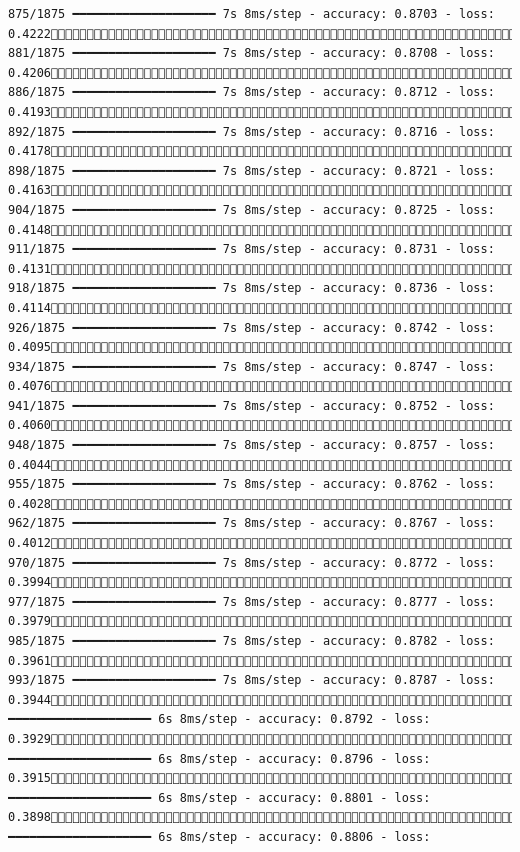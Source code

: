 \documentclass[
  letterpaper,
  DIV=11,
  numbers=noendperiod]{scrreprt}
\begin{document}
\begin{verbatim}
875/1875 ━━━━━━━━━━━━━━━━━━━━ 7s 8ms/step - accuracy: 0.8703 - loss: 0.4222 881/1875 ━━━━━━━━━━━━━━━━━━━━ 7s 8ms/step - accuracy: 0.8708 - loss: 0.4206 886/1875 ━━━━━━━━━━━━━━━━━━━━ 7s 8ms/step - accuracy: 0.8712 - loss: 0.4193 892/1875 ━━━━━━━━━━━━━━━━━━━━ 7s 8ms/step - accuracy: 0.8716 - loss: 0.4178 898/1875 ━━━━━━━━━━━━━━━━━━━━ 7s 8ms/step - accuracy: 0.8721 - loss: 0.4163 904/1875 ━━━━━━━━━━━━━━━━━━━━ 7s 8ms/step - accuracy: 0.8725 - loss: 0.4148 911/1875 ━━━━━━━━━━━━━━━━━━━━ 7s 8ms/step - accuracy: 0.8731 - loss: 0.4131 918/1875 ━━━━━━━━━━━━━━━━━━━━ 7s 8ms/step - accuracy: 0.8736 - loss: 0.4114 926/1875 ━━━━━━━━━━━━━━━━━━━━ 7s 8ms/step - accuracy: 0.8742 - loss: 0.4095 934/1875 ━━━━━━━━━━━━━━━━━━━━ 7s 8ms/step - accuracy: 0.8747 - loss: 0.4076 941/1875 ━━━━━━━━━━━━━━━━━━━━ 7s 8ms/step - accuracy: 0.8752 - loss: 0.4060 948/1875 ━━━━━━━━━━━━━━━━━━━━ 7s 8ms/step - accuracy: 0.8757 - loss: 0.4044 955/1875 ━━━━━━━━━━━━━━━━━━━━ 7s 8ms/step - accuracy: 0.8762 - loss: 0.4028 962/1875 ━━━━━━━━━━━━━━━━━━━━ 7s 8ms/step - accuracy: 0.8767 - loss: 0.4012 970/1875 ━━━━━━━━━━━━━━━━━━━━ 7s 8ms/step - accuracy: 0.8772 - loss: 0.3994 977/1875 ━━━━━━━━━━━━━━━━━━━━ 7s 8ms/step - accuracy: 0.8777 - loss: 0.3979 985/1875 ━━━━━━━━━━━━━━━━━━━━ 7s 8ms/step - accuracy: 0.8782 - loss: 0.3961 993/1875 ━━━━━━━━━━━━━━━━━━━━ 7s 8ms/step - accuracy: 0.8787 - loss: 0.39441000/1875 ━━━━━━━━━━━━━━━━━━━━ 6s 8ms/step - accuracy: 0.8792 - loss: 0.39291007/1875 ━━━━━━━━━━━━━━━━━━━━ 6s 8ms/step - accuracy: 0.8796 - loss: 0.39151015/1875 ━━━━━━━━━━━━━━━━━━━━ 6s 8ms/step - accuracy: 0.8801 - loss: 0.38981022/1875 ━━━━━━━━━━━━━━━━━━━━ 6s 8ms/step - accuracy: 0.8806 - loss: 
\end{verbatim}
\end{document}
